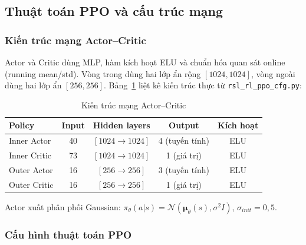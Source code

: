\subsection{Thuật toán PPO và cấu trúc mạng}
\label{sec:ppo}

\subsubsection{Kiến trúc mạng Actor–Critic}

Actor và Critic dùng MLP, hàm kích hoạt ELU và chuẩn hóa quan sát online
(running mean/std). Vòng trong dùng hai lớp ẩn rộng $[1024,1024]$, vòng ngoài
dùng hai lớp ẩn $[256,256]$. Bảng~\ref{tab:network_arch} liệt
kê kiến trúc thực từ \texttt{rsl\_rl\_ppo\_cfg.py}:

\begin{table}[H]
    \centering
    \caption{Kiến trúc mạng Actor–Critic}
    \label{tab:network_arch}
    \renewcommand{\arraystretch}{1.3}
    \begin{tabular}{|l|c|c|c|c|}
    \hline
    \textbf{Policy} & \textbf{Input} & \textbf{Hidden layers} & \textbf{Output} & \textbf{Kích hoạt} \\
    \hline
    Inner Actor  & 40 & $[1024\!\to\!1024]$         & 4 (tuyến tính) & ELU \\
    Inner Critic & 73 & $[1024\!\to\!1024]$         & 1 (giá trị)    & ELU \\
    Outer Actor  & 16 & $[256\!\to\!256]$          & 3 (tuyến tính) & ELU \\
    Outer Critic & 16 & $[256\!\to\!256]$          & 1 (giá trị)    & ELU \\
    \hline
    \end{tabular}
\end{table}

Actor xuất phân phối Gaussian:
$\pi_\theta(a|s)=\mathcal{N}(\boldsymbol{\mu}_\theta(s),\sigma^2 I)$,
$\sigma_{init}=0{,}5$.

\subsubsection{Cấu hình thuật toán PPO}


